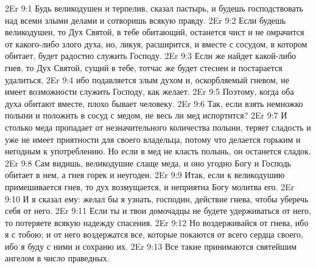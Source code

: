 \vs 2Er 9:1
Будь
великодушен и терпелив, сказал пастырь, и будешь господствовать над всеми
злыми делами и сотворишь всякую правду.
\vs 2Er 9:2
Если будешь великодушен,
то Дух Святой, в тебе обитающий, останется чист и не омрачится от какого-либо
злого духа, но, ликуя, расширится, и вместе с сосудом, в котором обитает,
будет радостно служить Господу.
\vs 2Er 9:3
Если же найдет какой-либо
гнев, то Дух Святой, сущий в тебе, тотчас же будет стеснен и постарается
удалиться,
\vs 2Er 9:4
ибо подавляется злым духом
и, оскорбляемый гневом, не имеет возможности служить Господу, как желает.
\vs 2Er 9:5
Поэтому, когда оба духа
обитают вместе, плохо бывает человеку.
\vs 2Er 9:6
Так, если взять немножко
полыни и положить в сосуд с медом, не весь ли мед испортится?
\vs 2Er 9:7
И столько меда пропадает
от незначительного количества полыни, теряет сладость и уже не имеет
приятности для своего владельца, потому что делается горьким и негодным к
употреблению. Но если в мед не класть полынь, он останется сладок.
\vs 2Er 9:8
Сам видишь, великодушие
слаще меда, и оно угодно Богу и Господь обитает в нем, а гнев горек и
неугоден.
\vs 2Er 9:9
Итак, если к великодушию
примешивается гнев, то дух возмущается, и неприятна Богу молитва его.
\vs 2Er 9:10
И я сказал ему: желал бы
я узнать, господин, действие гнева, чтобы уберечь себя от него.
\vs 2Er 9:11
Если ты и твои домочадцы
не будете удерживаться от него, то потеряете всякую надежду спасения.
\vs 2Er 9:12
Но воздерживайся от
гнева, ибо я с тобою; и от него воздержатся все, которые покаются от всего
сердца своего, ибо я буду с ними и сохраню их.
\vs 2Er 9:13
Все такие принимаются
святейшим ангелом в число праведных.

